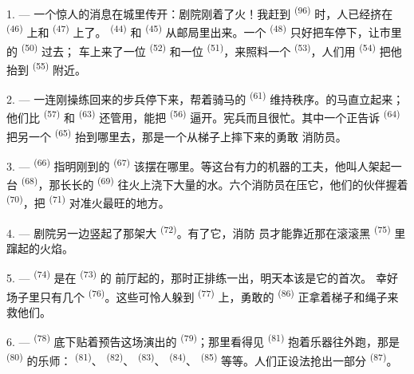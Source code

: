 \VUsaut{3.4mm}

1. --- 一个惊人的消息在城里传开：剧院刚着了火！我赶到
\textsuperscript{(96)} 时，人已经挤在 \textsuperscript{(46)} 上和
 \textsuperscript{(47)} 上了。 \textsuperscript{(44)} 和
 \textsuperscript{(45)} 从邮局里出来。一个
\textsuperscript{(48)} 只好把车停下，让市里的 \textsuperscript{(50)} 过去；
车上来了一位 \textsuperscript{(52)} 和一位
\textsuperscript{(51)}，来照料一个 \textsuperscript{(53)}，人们用
 \textsuperscript{(54)} 把他抬到 \textsuperscript{(55)} 附近。

2. --- 一连刚操练回来的步兵停下来，帮着骑马的 \textsuperscript{(61)}
维持秩序。的马直立起来；他们比
\textsuperscript{(57)} 和 \textsuperscript{(63)} 还管用，能把
 \textsuperscript{(56)} 逼开。宪兵而且很忙。其中一个正告诉 \textsuperscript{(64)} 把另一个
 \textsuperscript{(65)} 抬到哪里去，那是一个从梯子上摔下来的勇敢
消防员。

3. ---  \textsuperscript{(66)} 指明刚到的
\textsuperscript{(67)} 该摆在哪里。等这台有力的机器的工夫，他叫人架起一台
 \textsuperscript{(68)}，那长长的 \textsuperscript{(69)}
往火上浇下大量的水。六个消防员在压它，他们的伙伴握着
\textsuperscript{(70)}，把 \textsuperscript{(71)} 对准火最旺的地方。

4. --- 剧院另一边竖起了那架大 \textsuperscript{(72)}。有了它，消防
员才能靠近那在滚滚黑 \textsuperscript{(75)} 里蹿起的火焰。

\VUsaut{5.0mm}
\VUsaut{3.4mm}

5. ---  \textsuperscript{(74)} 是在 \textsuperscript{(73)} 的
前厅起的，那时正排练一出，明天本该是它的首次。
幸好场子里只有几个 \textsuperscript{(76)}。这些可怜人躲到
 \textsuperscript{(77)} 上，勇敢的 \textsuperscript{(86)}
正拿着梯子和绳子来救他们。

6. ---  \textsuperscript{(78)} 底下贴着预告这场演出的
\textsuperscript{(79)}；那里看得见 \textsuperscript{(81)}
抱着乐器往外跑，那是 \textsuperscript{(80)} 的乐师：
\textsuperscript{(81)}、 \textsuperscript{(82)}、
\textsuperscript{(83)}、 \textsuperscript{(84)}、 \textsuperscript{(85)}
等等。人们正设法抢出一部分 \textsuperscript{(87)}。


